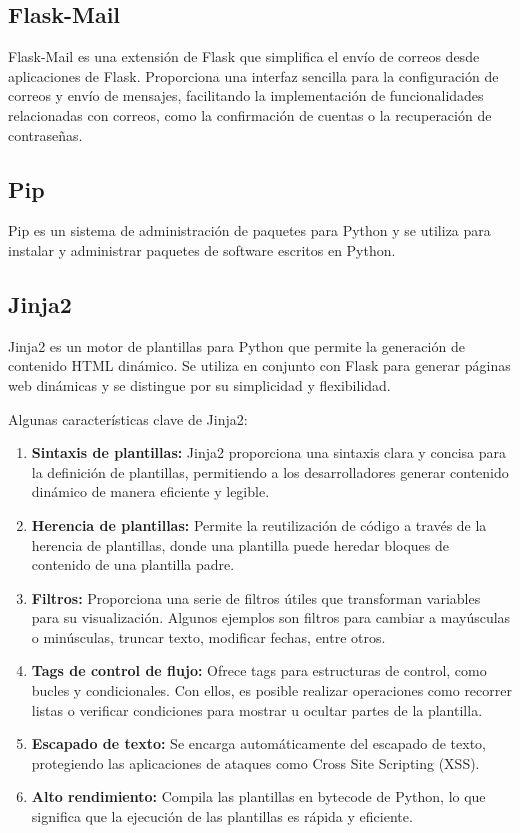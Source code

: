 \documentclass[a4paper, 12pt]{book}
\begin{document}
\subsection{Flask-Mail}
\label{subsec:flaskmail} 
Flask-Mail es una extensión de Flask que simplifica el envío de correos desde aplicaciones de Flask. Proporciona una interfaz sencilla 
para la configuración de correos y envío de mensajes, facilitando la implementación de funcionalidades relacionadas con correos, como la confirmación de cuentas 
o la recuperación de contraseñas.
\subsection{Pip} 
\label{subsec:pip} 
Pip es un sistema de administración de paquetes para Python y se utiliza para instalar y administrar paquetes de software escritos en Python.
\subsection{Jinja2}
\label{subsec:jinja2} 
Jinja2 es un motor de plantillas para Python que permite la generación de contenido HTML dinámico. Se utiliza en conjunto con Flask para 
generar páginas web dinámicas y se distingue por su simplicidad y flexibilidad. 

Algunas características clave de Jinja2:

\begin{enumerate}
  \item \textbf{Sintaxis de plantillas:} Jinja2 proporciona una sintaxis clara y concisa para la definición de plantillas, permitiendo a los desarrolladores generar 
  contenido dinámico de manera eficiente y legible.
  \item \textbf{Herencia de plantillas:} Permite la reutilización de código a través de la herencia de plantillas, donde una plantilla puede heredar bloques de contenido 
  de una plantilla padre.
  \item \textbf{Filtros:} Proporciona una serie de filtros útiles que transforman variables para su visualización. Algunos ejemplos son filtros para cambiar a mayúsculas 
  o minúsculas, truncar texto, modificar fechas, entre otros.
  \item \textbf{Tags de control de flujo:} Ofrece tags para estructuras de control, como bucles y condicionales. Con ellos, es posible realizar operaciones como recorrer 
  listas o verificar condiciones para mostrar u ocultar partes de la plantilla.
  \item \textbf{Escapado de texto:} Se encarga automáticamente del escapado de texto, protegiendo las aplicaciones de ataques como Cross Site Scripting (XSS).
  \item \textbf{Alto rendimiento:} Compila las plantillas en bytecode de Python, lo que significa que la ejecución de las plantillas es rápida y eficiente.
\end{enumerate}
\end{document}
